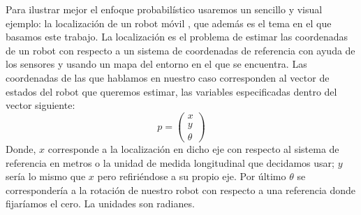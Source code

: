 Para ilustrar mejor el enfoque probabilístico usaremos un sencillo y visual ejemplo: la localización de un robot móvil \cite{thrun_probabilistic_2005}, que además es el tema en el que basamos este trabajo. La localización es el problema de estimar las coordenadas de un robot con respecto a un sistema de coordenadas de referencia con ayuda de los sensores y usando un mapa del entorno en el que se encuentra. Las coordenadas de las que hablamos en nuestro caso corresponden al vector de estados del robot que queremos estimar, las variables especificadas dentro del vector siguiente:
%
%
%
\begin{equation}
p = 
\left(
\begin{array}{cccc}
x \\
y \\
\theta 
\end{array}
\right)
\end{equation}
Donde, $x$ corresponde a la localización en dicho eje con respecto al sistema de referencia en metros o la unidad de medida longitudinal que decidamos usar; $y$ sería lo mismo que $x$ pero refiriéndose a su propio eje. Por último $\theta$ se correspondería a la rotación de nuestro robot con respecto a una referencia donde fijaríamos el cero. La unidades son radianes.
%
%
%
%
%
%
%
%
%

